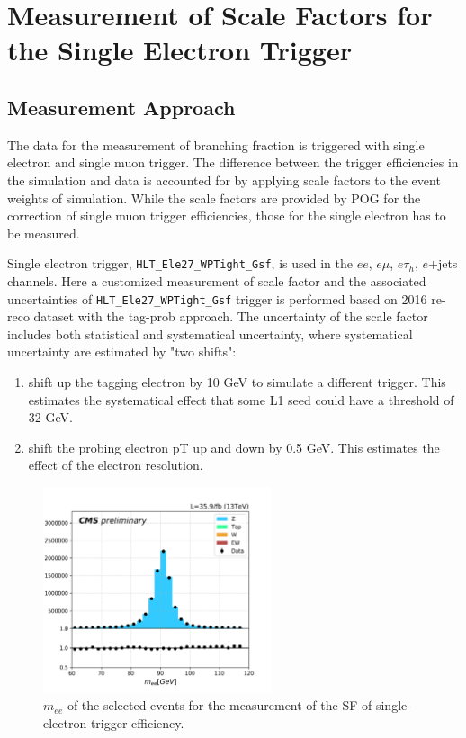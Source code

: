 
\section{Measurement of Scale Factors for the Single Electron Trigger}
\label{sec:app:eTriggerEff}

\subsection{Measurement Approach}

The data for the measurement of \PW branching fraction is triggered with single electron and single muon trigger. The difference between the trigger efficiencies in the simulation and data is accounted for by applying scale factors to the event weights of simulation. While the scale factors are provided by POG for the correction of single muon trigger efficiencies, those for the single electron has to be measured. 

Single electron trigger, \texttt{HLT\_Ele27\_WPTight\_Gsf}, is used in the $ee$, $e\mu$, $e\tau_h$, $e$+jets channels. Here a customized measurement of scale factor and the associated uncertainties of \texttt{HLT\_Ele27\_WPTight\_Gsf} trigger is performed based on 2016 re-reco dataset with the tag-prob approach. The uncertainty of the scale factor includes both statistical and systematical uncertainty, where systematical uncertainty are estimated by
"two shifts":

\begin{enumerate}
  \item shift up the tagging electron by 10 GeV to simulate a different trigger. This estimates the systematical effect that some L1 seed could have a threshold of 32 GeV.
  \item shift the probing electron pT up and down by 0.5 GeV. This estimates the effect of the electron \pt resolution.
\end{enumerate}


\begin{figure}
    \centering
    \includegraphics[width=0.6\textwidth]{chapters/Appendix/sectionEleTrigger/figures/dileptonMass_tag30.png}
    \caption{$m_{ee}$ of the selected events for the measurement of the SF of single-electron trigger efficiency.}
    \label{fig:appendix:ele27TriggerSF}
\end{figure}


